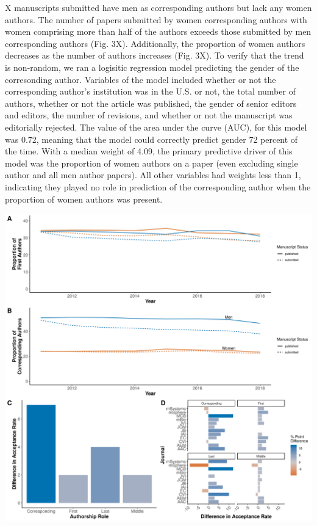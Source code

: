 \documentclass[11pt,]{article}
\begin{document}
X manuscripts submitted have men as corresponding authors but lack any
women authors. The number of papers submitted by women corresponding
authors with women comprising more than half of the authors exceeds
those submitted by men corresponding authors (Fig. 3X). Additionally,
the proportion of women authors decreases as the number of authors
increases (Fig. 3X). To verify that the trend is non-random, we ran a
logisitic regression model predicting the gender of the corresonding
author. Variables of the model included whether or not the corresponding
author's institution was in the U.S. or not, the total number of
authors, whether or not the article was published, the gender of senior
editors and editors, the number of revisions, and whether or not the
manuscript was editorially rejected. The value of the area under the
curve (AUC), for this model was 0.72, meaning that the model could
correctly predict gender 72 percent of the time. With a median weight of
4.09, the primary predictive driver of this model was the proportion of
women authors on a paper (even excluding single author and all men
author papers). All other variables had weights less than 1, indicating
they played no role in prediction of the corresponding author when the
proportion of women authors was present.

\includegraphics{Figure_4.png}
\end{document}
